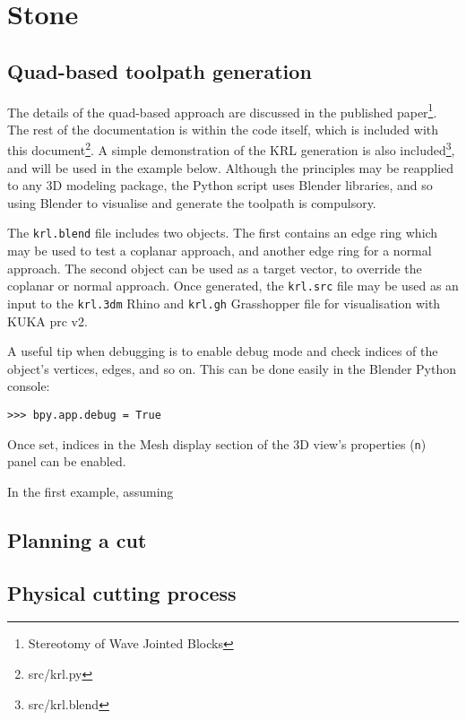 \section{Stone}
\subsection{Quad-based toolpath generation}
The details of the quad-based approach are discussed in the published paper\footnote{Stereotomy of Wave Jointed Blocks}. The rest of the documentation is within the code itself, which is included with this document\footnote{src/krl.py}. A simple demonstration of the KRL generation is also included\footnote{src/krl.blend}, and will be used in the example below. Although the principles may be reapplied to any 3D modeling package, the Python script uses Blender libraries, and so using Blender to visualise and generate the toolpath is compulsory.

The {\tt krl.blend} file includes two objects. The first contains an edge ring which may be used to test a coplanar approach, and another edge ring for a normal approach. The second object can be used as a target vector, to override the coplanar or normal approach. Once generated, the {\tt krl.src} file may be used as an input to the {\tt krl.3dm} Rhino and {\tt krl.gh} Grasshopper file for visualisation with KUKA prc v2.

A useful tip when debugging is to enable debug mode and check indices of the object's vertices, edges, and so on. This can be done easily in the Blender Python console:

\begin{lstlisting}
>>> bpy.app.debug = True
\end{lstlisting}

Once set, indices in the Mesh display section of the 3D view's properties ({\tt n}) panel can be enabled.

In the first example, assuming %

\subsection{Planning a cut}
\subsection{Physical cutting process}
